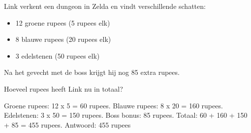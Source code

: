 \begin{opgave}
Link verkent een dungeon in Zelda en vindt verschillende schatten:

\begin{itemize}
\item 12 groene rupees (5 rupees elk)
\item 8 blauwe rupees (20 rupees elk)  
\item 3 edelstenen (50 rupees elk)
\end{itemize}

Na het gevecht met de boss krijgt hij nog 85 extra rupees.

Hoeveel rupees heeft Link nu in totaal?
\end{opgave}

\begin{oplossing}
Groene rupees: 12 x 5 = 60 rupees.
Blauwe rupees: 8 x 20 = 160 rupees.
Edelstenen: 3 x 50 = 150 rupees.
Boss bonus: 85 rupees.
Totaal: 60 + 160 + 150 + 85 = 455 rupees.
Antwoord: 455 rupees
\end{oplossing}